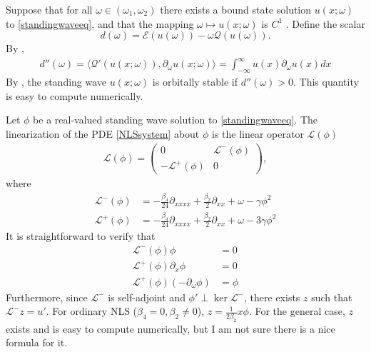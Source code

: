 \documentclass[12pt]{article}
\def\calE{{\mathcal E}}
\def\calQ{{\mathcal Q}}
\def\calL{{\mathcal L}}
\begin{document}
Suppose that for all $\omega \in (\omega_1, \omega_2)$ there exists a bound state solution $u(x; \omega)$ to \cref{standingwaveeq}, and that the mapping $\omega \mapsto u(x; \omega)$ is $C^1$ \cite[Assumption 2]{Grillakis1987}. Define the scalar
\begin{equation}
d(\omega) = \calE(u(\omega)) - \omega\calQ(u(\omega)).
\end{equation}
By \cite[(2.21)]{Grillakis1987},
\begin{align*}
d''(\omega) = \langle \calQ'(u(x; \omega)), \partial_\omega u(x; \omega) \rangle
= \int_{-\infty}^\infty u(x) \partial_\omega u(x) dx
\end{align*}
By \cite[Theorem 3.5]{Grillakis1987}, the standing wave $u(x; \omega)$ is orbitally stable if $d''(\omega) > 0$. This quantity is easy to compute numerically.

Let $\phi$ be a real-valued standing wave solution to \cref{standingwaveeq}. The linearization of the PDE \cref{NLSsystem} about $\phi$ is the linear operator $\calL(\phi)$
\begin{align}\label{defLphi}
\calL(\phi) = 
\begin{pmatrix}
0 & \calL^-(\phi) \\
-\calL^+(\phi) & 0
\end{pmatrix},
\end{align}
where
\begin{align*}
\calL^-(\phi) &= -\frac{\beta_4}{24} \partial_{xxxx} + \frac{\beta_2}{2} \partial_{xx} + \omega - \gamma \phi^2 \\
\calL^+(\phi) &= -\frac{\beta_4}{24} \partial_{xxxx} + \frac{\beta_2}{2} \partial_{xx} + \omega - 3 \gamma \phi^2
\end{align*}
It is straightforward to verify that 
\begin{align*}
\calL^-(\phi) \phi &= 0 \\
\calL^+(\phi) \partial_x \phi &= 0 \\
\calL^+(\phi)(-\partial_\omega \phi) &= \phi
\end{align*}
Furthermore, since $\calL^-$ is self-adjoint and $\phi' \perp \ker \calL^-$, there exists $z$ such that $\calL^- z = u'$. For ordinary NLS ($\beta_4 = 0, \beta_2 \neq 0$), $z = \frac{1}{2 \beta_2} x \phi$. For the general case, $z$ exists and is easy to compute numerically, but I am not sure there is a nice formula for it.
\end{document}
